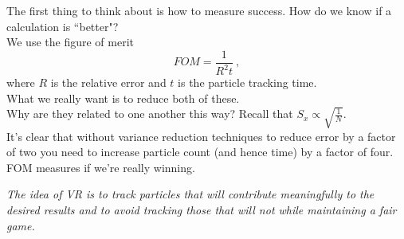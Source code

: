 \documentclass[12pt]{article}
\begin{document}
The first thing to think about is how to measure success. How do we know if a calculation is ``better"?\\
We use the figure of merit
\[
FOM =\frac{1}{R^2 t}\:,
\]
where $R$ is the relative error and $t$ is the particle tracking time.\\
What we really want is to reduce both of these. \\
Why are they related to one another this way? Recall that $S_x \propto \sqrt{\frac{1}{N}}$.\\
It's clear that without variance reduction techniques to reduce error by a factor of two you need to increase particle count (and hence time) by a factor of four.\\
FOM measures if we're really winning.

\textit{The idea of VR is to track particles that will contribute meaningfully to the desired results and to avoid tracking those that will not while maintaining a fair game.}
\end{document}
